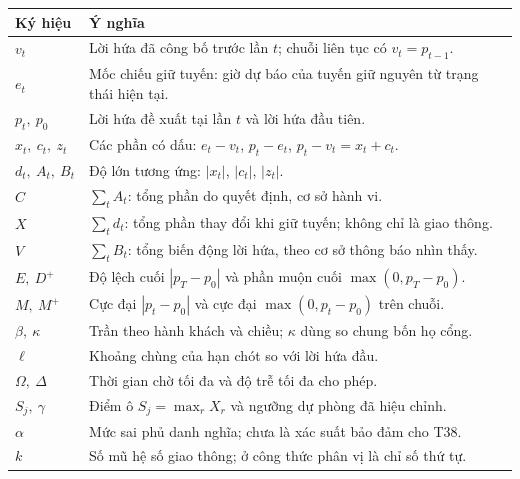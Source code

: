 \begin{longtable}{@{}p{2.4cm}p{12.4cm}@{}}
\toprule
\textbf{Ký hiệu} & \textbf{Ý nghĩa}\\
\midrule
\endhead
$v_t$ & Lời hứa đã công bố trước lần $t$; chuỗi liên tục có $v_t=p_{t-1}$.\\
$e_t$ & Mốc chiếu giữ tuyến: giờ dự báo của tuyến giữ nguyên từ trạng thái hiện tại.\\
$p_t,\ p_0$ & Lời hứa đề xuất tại lần $t$ và lời hứa đầu tiên.\\
$x_t,\ c_t,\ z_t$ & Các phần có dấu: $e_t-v_t$, $p_t-e_t$, $p_t-v_t=x_t+c_t$.\\
$d_t,\ A_t,\ B_t$ & Độ lớn tương ứng: $|x_t|$, $|c_t|$, $|z_t|$.\\
$C$ & $\sum_t A_t$: tổng phần do quyết định, cơ sở hành vi.\\
$X$ & $\sum_t d_t$: tổng phần thay đổi khi giữ tuyến; không chỉ là giao thông.\\
$V$ & $\sum_t B_t$: tổng biến động lời hứa, theo cơ sở thông báo nhìn thấy.\\
$E,\ D^{+}$ & Độ lệch cuối $|p_T-p_0|$ và phần muộn cuối $\max(0,p_T-p_0)$.\\
$M,\ M^{+}$ & Cực đại $|p_t-p_0|$ và cực đại $\max(0,p_t-p_0)$ trên chuỗi.\\
$\beta,\ \kappa$ & Trần theo hành khách và chiều; $\kappa$ dùng so chung bốn họ cổng.\\
$\ell$ & Khoảng chùng của hạn chót so với lời hứa đầu.\\
$\Omega,\ \Delta$ & Thời gian chờ tối đa và độ trễ tối đa cho phép.\\
$S_j,\ \gamma$ & Điểm ô $S_j=\max_r X_r$ và ngưỡng dự phòng đã hiệu chỉnh.\\
$\alpha$ & Mức sai phủ danh nghĩa; chưa là xác suất bảo đảm cho T38.\\
$k$ & Số mũ hệ số giao thông; ở công thức phân vị là chỉ số thứ tự.\\
\bottomrule
\end{longtable}

\clearpage
